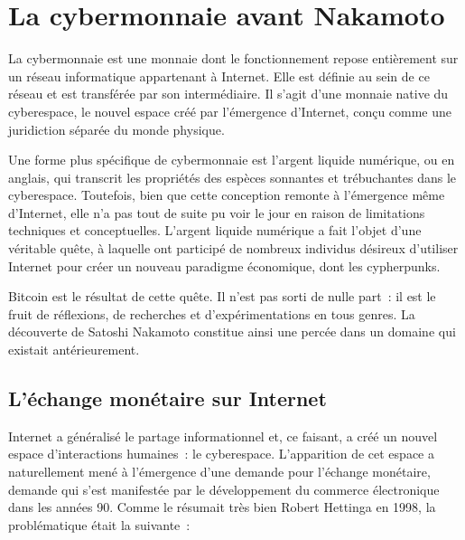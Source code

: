 
\chapter{La cybermonnaie avant Nakamoto}
\label{ch:6}

La cybermonnaie est une monnaie dont le fonctionnement repose entièrement sur un réseau informatique appartenant à Internet. Elle est définie au sein de ce réseau et est transférée par son intermédiaire. Il s'agit d'une monnaie native du cyberespace, le nouvel espace créé par l'émergence d'Internet, conçu comme une juridiction séparée du monde physique.

Une forme plus spécifique de cybermonnaie est l'argent liquide numérique, ou  en anglais, qui transcrit les propriétés des espèces sonnantes et trébuchantes dans le cyberespace. Toutefois, bien que cette conception remonte à l'émergence même d'Internet, elle n'a pas tout de suite pu voir le jour en raison de limitations techniques et conceptuelles. L'argent liquide numérique a fait l'objet d'une véritable quête, à laquelle ont participé de nombreux individus désireux d'utiliser Internet pour créer un nouveau paradigme économique, dont les cypherpunks.

Bitcoin est le résultat de cette quête. Il n'est pas sorti de nulle part~: il est le fruit de réflexions, de recherches et d'expérimentations en tous genres. La découverte de Satoshi Nakamoto constitue ainsi une percée dans un domaine qui existait antérieurement.

\section*{L'échange monétaire sur Internet}

Internet a généralisé le partage informationnel et, ce faisant, a créé un nouvel espace d'interactions humaines~: le cyberespace. L'apparition de cet espace a naturellement mené à l'émergence d'une demande pour l'échange monétaire, demande qui s'est manifestée par le développement du commerce électronique dans les années 90. Comme le résumait très bien Robert Hettinga en 1998, la problématique était la suivante~:


